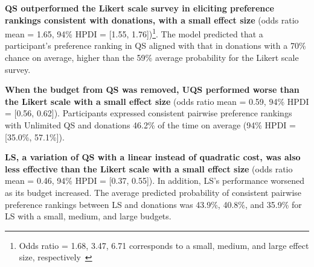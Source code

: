 \textbf{QS outperformed the Likert scale survey in eliciting preference rankings consistent with donations, with a small effect size} (odds ratio mean = 1.65, 94\% HPDI = [1.55, 1.76])\footnote{Odds ratio = 1.68, 3.47, 6.71 corresponds to a small, medium, and large effect size, respectively~\cite{chen2010big}}. The model predicted that a participant's preference ranking in QS aligned with that in donations with a 70\% chance on average, higher than the 59\% average probability for the Likert scale survey. 

\textbf{When the budget from QS was removed, UQS performed worse than the Likert scale with a small effect size} (odds ratio mean = 0.59, 94\% HPDI = [0.56, 0.62]). Participants expressed consistent pairwise preference rankings with Unlimited QS and donations 46.2\% of the time on average (94\% HPDI = [35.0\%, 57.1\%]). 

\textbf{LS, a variation of QS with a linear instead of quadratic cost, was also less effective than the Likert scale with a small effect size} (odds ratio mean = 0.46, 94\% HPDI = [0.37, 0.55]). In addition, LS's performance worsened as its budget increased. The average predicted probability of consistent pairwise preference rankings between LS and donations was 43.9\%, 40.8\%, and 35.9\% for LS with a small, medium, and large budgets.  